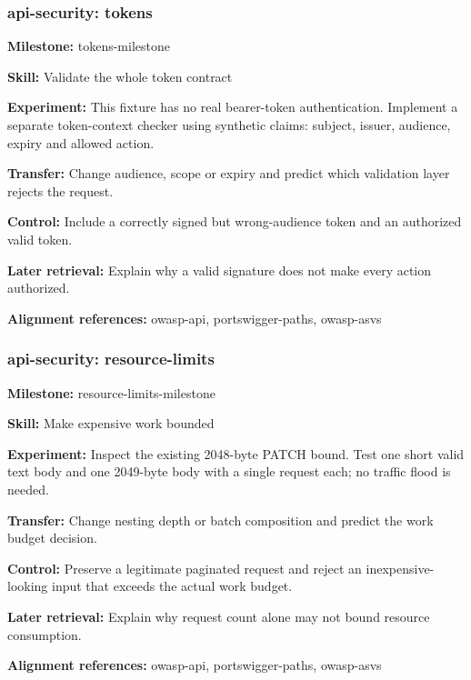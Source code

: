 \subsubsection{api-security: tokens}
\noindent\textbf{Milestone:} tokens-milestone\par
\noindent\textbf{Skill:} Validate the whole token contract\par
\noindent\textbf{Experiment:} This fixture has no real bearer-token authentication. Implement a separate token-context checker using synthetic claims: subject, issuer, audience, expiry and allowed action.\par
\noindent\textbf{Transfer:} Change audience, scope or expiry and predict which validation layer rejects the request.\par
\noindent\textbf{Control:} Include a correctly signed but wrong-audience token and an authorized valid token.\par
\noindent\textbf{Later retrieval:} Explain why a valid signature does not make every action authorized.\par
\noindent\textbf{Alignment references:} owasp-api, portswigger-paths, owasp-asvs\par
\subsubsection{api-security: resource-limits}
\noindent\textbf{Milestone:} resource-limits-milestone\par
\noindent\textbf{Skill:} Make expensive work bounded\par
\noindent\textbf{Experiment:} Inspect the existing 2048-byte PATCH bound. Test one short valid text body and one 2049-byte body with a single request each; no traffic flood is needed.\par
\noindent\textbf{Transfer:} Change nesting depth or batch composition and predict the work budget decision.\par
\noindent\textbf{Control:} Preserve a legitimate paginated request and reject an inexpensive-looking input that exceeds the actual work budget.\par
\noindent\textbf{Later retrieval:} Explain why request count alone may not bound resource consumption.\par
\noindent\textbf{Alignment references:} owasp-api, portswigger-paths, owasp-asvs\par
